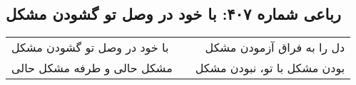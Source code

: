 \begin{center}
\section*{رباعی شماره ۴۰۷: با خود در وصل تو گشودن مشکل}
\label{sec:sh407}
\begin{longtable}{l p{0.5cm} r}
با خود در وصل تو گشودن مشکل
&&
دل را به فراق آزمودن مشکل
\\
مشکل حالی و طرفه مشکل حالی
&&
بودن مشکل با تو، نبودن مشکل
\\
\end{longtable}
\end{center}
